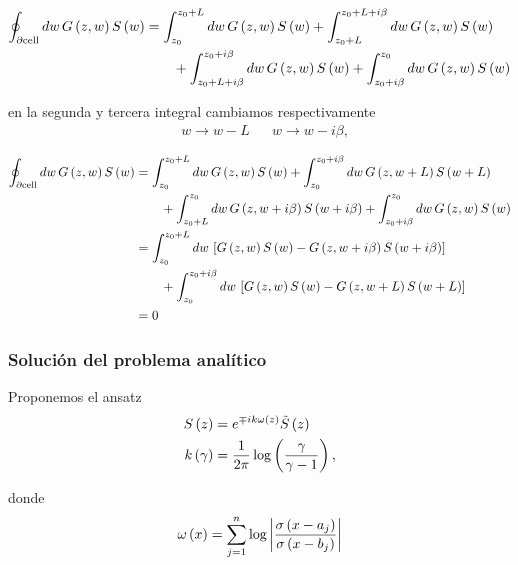 \documentclass[../main.tex]{subfiles}
\begin{document}
\begin{align*}
	\oint_{\partial \text{cell}} dw\, G\left ( z, w \right ) S\left ( w \right ) & =
	\int_{z_0}^{z_0 + L} dw\, G\left ( z, w \right ) S\left ( w \right ) +
	\int_{z_0 + L}^{z_0 + L + i \beta} dw\, G\left ( z, w \right ) S\left ( w \right ) \\
	& \qquad + \int_{z_0 + L + i \beta}^{z_0 + i \beta} dw\, G\left ( z, w \right ) S\left ( w \right ) +
	\int_{z_0 + i \beta}^{z_0} dw\, G\left ( z, w \right ) S\left ( w \right )
\end{align*}

\noindent en la segunda y tercera integral cambiamos respectivamente
\begin{align*}
	& w \to w - L & & w \to w - i \beta,
\end{align*}

\begin{align*}
	\oint_{\partial \text{cell}} dw\, G\left ( z, w \right ) S\left ( w \right ) & =
	\int_{z_0}^{z_0 + L} dw\, G\left ( z, w \right ) S\left ( w \right ) +
	\int_{z_0}^{z_0 + i \beta} dw\, G\left ( z, w + L \right ) S\left ( w + L \right ) \\
	& \qquad + \int_{z_0 + L}^{z_0} dw\, G\left ( z, w + i \beta \right ) S\left ( w + i \beta \right ) +
	\int_{z_0 + i \beta}^{z_0} dw\, G\left ( z, w \right ) S\left ( w \right ) \\
	& = \int_{z_0}^{z_0 + L} dw\, \left [ G\left ( z, w \right ) S\left ( w \right ) - G\left ( z, w + i \beta \right ) S\left ( w + i \beta \right ) \right ] \\
	& \qquad + \int_{z_0}^{z_0 + i \beta} dw\, \left [ G\left ( z, w \right ) S\left ( w \right ) - G\left ( z, w + L \right ) S\left ( w + L \right ) \right ] \\
	& = 0
\end{align*}

\subsubsection{Solución del problema analítico}

Proponemos el ansatz
\begin{align*}
	S\left ( z \right ) & = e^{\mp i k \omega\left ( z \right )} \tilde S\left ( z \right ) \\
	k\left ( \gamma \right ) & = \frac 1{2 \pi} \log\left ( \frac \gamma{\gamma - 1} \right ),
\end{align*}

\noindent donde
\begin{align*}
	\omega\left ( x \right ) = \sum_{j = 1}^n \log\left | \frac{\sigma\left ( x - a_j \right )}{\sigma\left ( x - b_j \right )} \right |
\end{align*}
\end{document}
